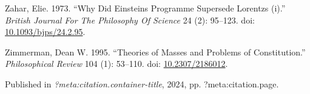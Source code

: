 \documentclass[
  10pt,
  letterpaper,
  DIV=11,
  numbers=noendperiod,
  twoside]{scrartcl}
\newlength{\cslhangindent}
\newenvironment{CSLReferences}[2] %
 {\begin{list}{}{%
  \setlength{\itemindent}{0pt}
  \setlength{\leftmargin}{0pt}
  \setlength{\parsep}{0pt}
  \ifodd #1
   \setlength{\leftmargin}{\cslhangindent}
   \setlength{\itemindent}{-1\cslhangindent}
  \fi
  \setlength{\itemsep}{#2\baselineskip}}}
 {\end{list}}
\begin{document}
\begin{CSLReferences}{1}{0}
Zahar, Elie. 1973. {``Why Did Einsteins Programme Supersede Lorentzs
(i).''} \emph{British Journal For The Philosophy Of Science} 24 (2):
95--123. doi:
\href{https://doi.org/10.1093/bjps/24.2.95}{10.1093/bjps/24.2.95}.

Zimmerman, Dean W. 1995. {``Theories of Masses and Problems of
Constitution.''} \emph{Philosophical Review} 104 (1): 53--110. doi:
\href{https://doi.org/10.2307/2186012}{10.2307/2186012}.

\end{CSLReferences}



\noindent Published in\emph{
?meta:citation.container-title}, 2024, pp. ?meta:citation.page.
\end{document}
